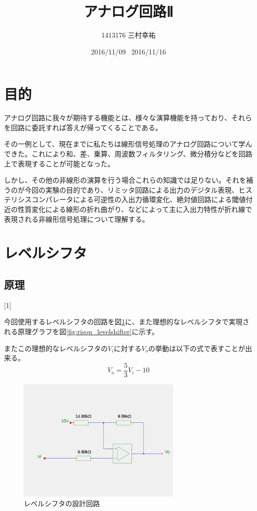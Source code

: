 \documentclass[11pt,a4j]{jsarticle}
\title{アナログ回路Ⅱ}
\author{1413176 三村幸祐}
\date{2016/11/09 \, 2016/11/16}
\begin{document}
  
 \tableofcontents \newpage
  
 \section{目的}
 アナログ回路に我々が期待する機能とは、様々な演算機能を持っており、それらを回路に委託すれば答えが帰ってくることである。
 
  その一例として、現在までに私たちは線形信号処理のアナログ回路について学んできた。これにより和、差、乗算、周波数フィルタリング、微分積分などを回路上で表現することが可能となった。
  
  しかし、その他の非線形の演算を行う場合これらの知識では足りない。それを補うのが今回の実験の目的であり、リミッタ回路による出力のデジタル表現、ヒステリシスコンパレータによる可逆性の入出力循環変化、絶対値回路による閾値付近の性質変化による線形の折れ曲がり、などによって主に入出力特性が折れ線で表現される非線形信号処理について理解する。
  
 \section{レベルシフタ}
  \subsection{原理}[1]
   
   今回使用するレベルシフタの回路を図\ref{fig:levelshifter}に、また理想的なレベルシフタで実現される原理グラフを図\ref{fig:risou_levelshifter}に示す。
   
   またこの理想的なレベルシフタの$V_i$に対する$V_o$の挙動は以下の式で表すことが出来る。
   \begin{equation}
   V_o = \frac{5}{3} V_i - 10 \label{equ:1}
   \end{equation}
   
   \begin{figure}[htbp]
  \centering
  \includegraphics[width=8cm,clip]{levelshifter.png}
  \caption{レベルシフタの設計回路}
  \label{fig:levelshifter}
 \end{figure}%
   
\end{document}
